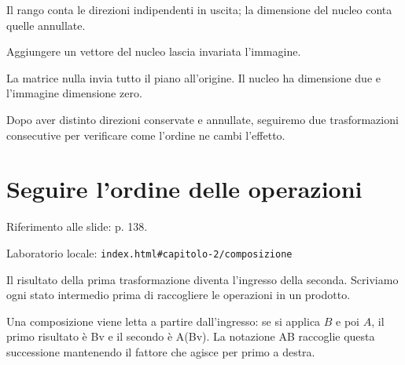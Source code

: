 Il rango conta le direzioni indipendenti in uscita; la dimensione del nucleo conta quelle annullate.\par


\label{c2-nucleo-example-2-step-6}


Aggiungere un vettore del nucleo lascia invariata l'immagine.\par



La matrice nulla invia tutto il piano all'origine. Il nucleo ha dimensione due e l'immagine dimensione zero.\par


Dopo aver distinto direzioni conservate e annullate, seguiremo due trasformazioni consecutive per verificare come l'ordine ne cambi l'effetto.\par



\Needspace{.43\textheight}
\section{Seguire l'ordine delle operazioni}
\label{c2-composizione}

{\sffamily\small\color{Ink!70} Riferimento alle slide: p. 138.\par}

{\sffamily\small\color{Ink!70} Laboratorio locale: \nolinkurl{index.html#capitolo-2/composizione}\par}

Il risultato della prima trasformazione diventa l'ingresso della seconda. Scriviamo ogni stato intermedio prima di raccogliere le operazioni in un prodotto.\par

Una composizione viene letta a partire dall'ingresso: se si applica \(B\) e poi \(A\), il primo risultato è Bv e il secondo è A(Bv). La notazione AB raccoglie questa successione mantenendo il fattore che agisce per primo a destra.\par

